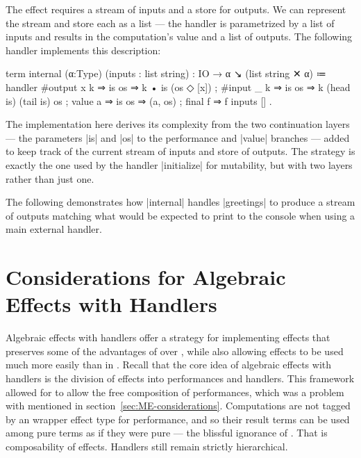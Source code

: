 The \IO effect requires a stream of inputs and a store for outputs.
We can represent the stream and store each as a list --- the \IO handler is parametrized by a list of inputs and results in the computation's value and a list of outputs.
The following handler implements this description:
%
\begin{program}[caption={Handler for pure \IO}]
term internal (α:Type) (inputs : list string) : IO → α ↘ (list string ✕ α)
  ≔ handler
      { #output x k ⇒ is os ⇒ k • is (os ◇ [x])
      ; #input  _ k ⇒ is os ⇒ k (head is) (tail is) os
      ; value     a ⇒ is os ⇒ (a, os)
      ; final     f ⇒ f inputs [] }.
\end{program}
%
The implementation here derives its complexity from the two continuation layers --- the parameters \code|is| and \code|os| to the performance and \code|value| branches --- added to keep track of the current stream of inputs and store of outputs.
The strategy is exactly the one used by the handler \code|initialize| for mutability, but with two layers rather than just one.

The following demonstrates how \code|internal| handles \code|greetings| to produce a stream of outputs matching what would be expected to print to the console when using a main external handler.

\newpage


\section{Considerations for Algebraic Effects with Handlers}
\label{sec:AEH-considerations}

Algebraic effects with handlers offer a strategy for implementing effects that preserves some of the advantages of \LangC over \LangB, while also allowing effects to be used much more easily than in \LangC.
Recall that the core idea of algebraic effects with handlers is the division of effects into performances and handlers.
This framework allowed for \LangD to allow the free composition of performances, which was a problem with \LangC mentioned in section~\ref{sec:ME-considerations}.
Computations are not tagged by an wrapper effect type for performance, and so their result terms can be used among pure terms as if they were pure --- the blissful ignorance of \LangB.
That is composability of effects.
Handlers still remain strictly hierarchical.

